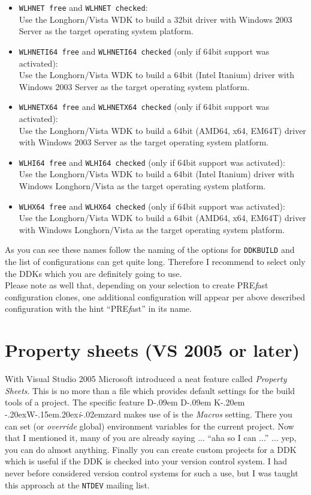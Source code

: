 \documentclass[a4paper,titlepage]{report}
\def\ddkwiz{D\kern-.09em D\kern-.09em K\kern-.20em \raise-.20ex\hbox{W}\kern-.15em\raise.20ex\hbox{\it{i}}\kern-.02em{zard}}
\newcommand{\prefast}[0]{\textsf{PRE\textsl{f}ast}}
\newcommand{\solcfg}[2]{\texttt{#1 free} and \texttt{#1 checked}:\\#2}
\newcommand{\solcfgsixfour}[2]{\texttt{#1 free} and \texttt{#1 checked} \textcolor[gray]{0.40}{\textsf{\small(only if 64bit support was activated)}}:\\#2}
\begin{document}
\begin{itemize}
  \item \solcfg{WLHNET}{Use the Longhorn/Vista WDK to build a 32bit driver with Windows 2003 Server as the target operating system platform.}
  \item \solcfgsixfour{WLHNETI64}{Use the Longhorn/Vista WDK to build a 64bit (Intel Itanium) driver with Windows 2003 Server as the target operating system platform.}
  \item \solcfgsixfour{WLHNETX64}{Use the Longhorn/Vista WDK to build a 64bit (AMD64, x64, EM64T) driver with Windows 2003 Server as the target operating system platform.}
  \item \solcfgsixfour{WLHI64}{Use the Longhorn/Vista WDK to build a 64bit (Intel Itanium) driver with Windows Longhorn/Vista as the target operating system platform.}
  \item \solcfgsixfour{WLHX64}{Use the Longhorn/Vista WDK to build a 64bit (AMD64, x64, EM64T) driver with Windows Longhorn/Vista as the target operating system platform.}
\end{itemize}

As you can see these names follow the naming of the options for \texttt{DDKBUILD} and
the list of configurations can get quite long. Therefore I recommend to select only
the DDKs which you are definitely going to use.\\

Please note as well that, depending on your selection to create \prefast{} configuration
clones, one additional configuration will appear per above described configuration
with the hint ``\prefast{}'' in its name.

\section{Property sheets (VS 2005 or later)}
\label{sec:propsheets}
With Visual Studio 2005 Microsoft introduced a neat feature called \emph{Property Sheets}.
This is no more than a file which provides default settings for the build tools
of a project. The specific feature \ddkwiz{} makes use of is the \emph{Macros}
setting. There you can set (or \emph{override} global) environment variables for the
current project. Now that I mentioned it, many of you are already saying ... ``aha
so I can ...'' ... yep, you can do almost anything. Finally you can create custom
projects for a DDK which is useful if the DDK is checked into your version control
system. I had never before considered version control systems for such a use, but
I was taught this approach at the \texttt{NTDEV} mailing list.
\end{document}
